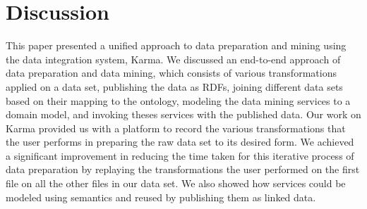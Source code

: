 \section{Discussion}
This paper presented a unified approach to data preparation and mining using the data integration system, Karma. We discussed an end-to-end approach of data preparation and data mining, which consists of various transformations applied on a data set, publishing the data as RDFs, joining different data sets based on their mapping to the ontology, modeling the data mining services to a domain model, and invoking theses services with the published data. Our work on Karma provided us with a platform to record the various transformations that the user performs in preparing the raw data set to its desired form. We achieved a significant improvement in reducing the time taken for this iterative process of data preparation by replaying the transformations the user performed on the first file on all the other files in our data set. We also showed how services could be modeled using semantics and reused by publishing them as linked data.